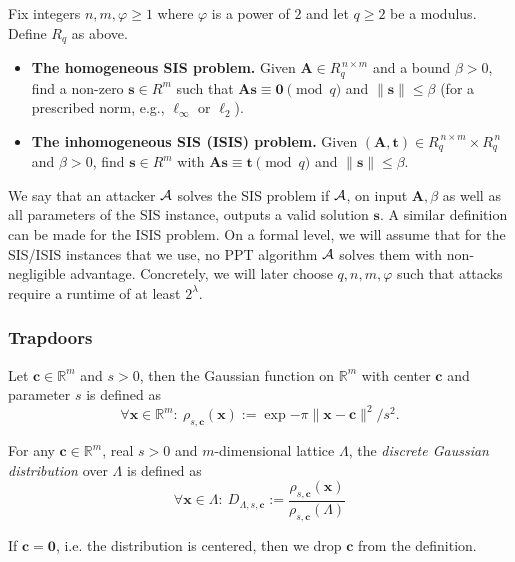 
\begin{definition}\label{def:sis-isis}
Fix integers $n,m,\varphi\ge 1$ where $\varphi$ is a power of $2$ and let  $q\ge 2$ be a modulus. Define $R_q$ as above.
\begin{itemize}[leftmargin=1.25em]
  \item \textbf{The homogeneous SIS  problem.} Given $\mathbf{A}\in R_q^{\,n\times m}$ and a bound $\beta>0$, find a non-zero $\mathbf{s}\in R^{m}$ such that $\mathbf{A}\mathbf{s}\equiv \mathbf{0}\pmod q$ and $\|\mathbf{s}\|\le\beta$ (for a prescribed norm, e.g., $\ell_\infty$ or $\ell_2$).
  \item \textbf{The inhomogeneous SIS (ISIS) problem.} Given $(\mathbf{A},\mathbf{t})\in R_q^{\,n\times m}\times R_q^{\,n}$ and $\beta>0$, find $\mathbf{s}\in R^{m}$ with $\mathbf{A}\mathbf{s}\equiv \mathbf{t}\pmod q$ and $\|\mathbf{s}\|\le\beta$.
\end{itemize}
We say that an attacker $\mathcal{A}$ solves the SIS problem if $\mathcal{A}$, on input $\mathbf{A},\beta$ as well as all parameters of the SIS instance, outputs a valid solution $\mathbf{s}$. A similar definition can be made for the ISIS problem. On a formal level, we will assume that for the SIS/ISIS instances that we use, no PPT algorithm $\mathcal{A}$ solves them with non-negligible advantage. Concretely, we will later choose $q,n,m,\varphi$ such that attacks require a runtime of at least $2^{\lambda}$.
\end{definition}

\subsubsection{Trapdoors}

Let $\mathbf{c}\in \mathbb{R}^m$ and $s>0$, then the Gaussian function on $\mathbb{R}^m$ with center $\mathbf{c}$ and parameter $s$ is defined as 
\[
\forall \mathbf{x}\in \mathbb{R}^m:~ \rho_{s,\mathbf{c}}(\mathbf{x}):=\exp{-\pi \|\mathbf{x}-\mathbf{c}\|^2/s^2}\text{.}
\]
\begin{definition}
For any $\mathbf{c}\in \mathbb{R}^m$, real $s>0$ and $m$-dimensional lattice $\Lambda$, the  \emph{discrete Gaussian distribution} over $\Lambda$ is defined as
\[
\forall \mathbf{x}\in \Lambda:~ D_{\Lambda,s,\mathbf{c}}:=\dfrac{\rho_{s,\mathbf{c}}(\mathbf{x})}{\rho_{s,\mathbf{c}}(\Lambda)}
\]
\end{definition}
If $\mathbf{c}=\mathbf{0}$, i.e. the distribution is centered, then we drop $\mathbf{c}$ from the definition.


